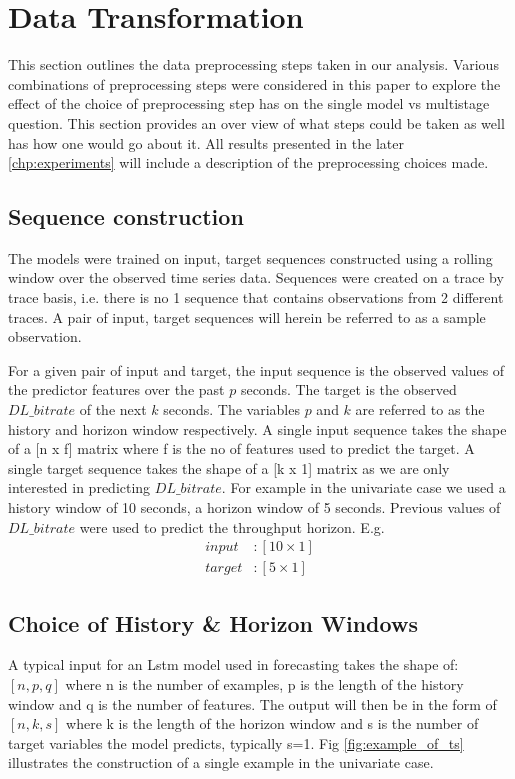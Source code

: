 \chapter{Data Transformation}
This section outlines the data preprocessing steps taken in our analysis. Various combinations of preprocessing steps were considered in this paper to explore the effect of the choice of preprocessing step has on the single model vs multistage question. This section provides an over view of what steps could be taken as well has how one would go about it. All results presented in the later \ref{chp:experiments} will include a description of the preprocessing choices made.

\section{Sequence construction}
The models were trained on input, target sequences constructed using a rolling window over the observed time series data. Sequences were created on a trace by trace basis, i.e. there is no 1 sequence that contains observations from 2 different traces. A pair of input, target sequences will herein be referred to as a sample observation.

For a given pair of input and target, the input sequence is the observed values of the predictor features over the past $p$ seconds. The target is the observed $DL\_bitrate$ of the next $k$ seconds. The variables $p$ and $k$ are referred to as the history and horizon window respectively. A single input sequence takes the shape of a [n x f] matrix where f is the no of features used to predict the target. A single target sequence takes the shape of a [k x 1] matrix as we are only interested in predicting $DL\_bitrate$. For example in the univariate case we used a history window of 10 seconds, a horizon window of 5 seconds. Previous values of $DL\_bitrate$ were used to predict the throughput horizon. E.g.
\begin{equation}
\begin{aligned}
 input&: [10 \times 1] \\
 target&: [5 \times 1]
\end{aligned}
\end{equation}

\section{Choice of History \& Horizon Windows}
A typical input for an Lstm model used in forecasting takes the shape of: $[ n, p, q ]$ where n is the number of examples, p is the length of the history window and q is the number of features. The output will then be in the form of $[n, k, s ]$ where k is the length of the horizon window and s is the number of target variables the model predicts, typically s=1. Fig \ref{fig:example_of_ts} illustrates the construction of a single example in the univariate case.

